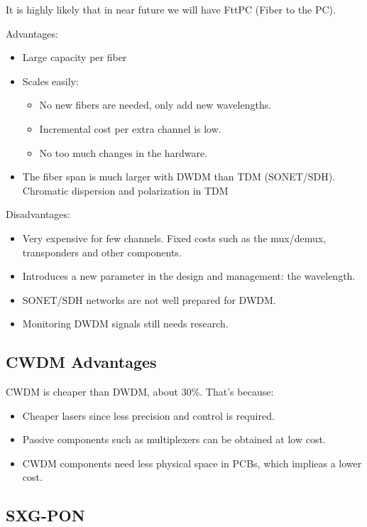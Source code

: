 \documentclass[../main.tex]{subfiles}
\begin{document}
It is highly likely that in near future we will have FttPC (Fiber to the PC).

Advantages:

\begin{itemize}
	\item Large capacity per fiber
	\item {
		Scales easily:
		\begin{itemize}
			\item No new fibers are needed, only add new wavelengths.
			\item Incremental cost per extra channel is low.
			\item No too much changes in the hardware.
		\end{itemize}
	}
	\item The fiber span is much larger with DWDM than TDM (SONET/SDH). Chromatic dispersion and polarization in TDM
\end{itemize}

Disadvantages:

\begin{itemize}
	\item Very expensive for few channels. Fixed costs such as the mux/demux, transponders and other components.
	\item Introduces a new parameter in the design and management: the wavelength.
	\item SONET/SDH networks are not well prepared for DWDM.
	\item Monitoring DWDM signals still needs research.
\end{itemize}

\subsection{CWDM Advantages}

CWDM is cheaper than DWDM, about 30\%. That’s because:

\begin{itemize}
	\item Cheaper lasers since less precision and control is required.
	\item Passive components such as multiplexers can be obtained at low cost.
	\item CWDM components need less physical space in PCBs, which implieas a lower cost.
\end{itemize}

\subsection{SXG-PON}
\end{document}
